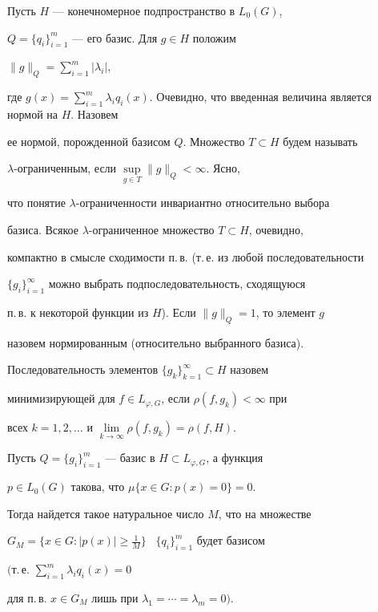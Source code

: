  


Пусть $H$ --- конечномерное подпространство в $L_0(G)$, 


$Q=\{q_i\}^m_{i=1}$ --- его базис. Для $g\in H$ положим 


$\|g\|_Q=\sum\limits^m_{i=1}|\lambda_i|$,


где $g(x)=\sum\limits^m_{i=1}\lambda_i 


q_i(x)$. Очевидно, что введенная величина является нормой на $H$. Назовем 


ее нормой, порожденной базисом $Q$. Множество $T\subset H$ будем называть 


$\lambda$-ограниченным, если $\sup\limits_{g\in T}\|g\|_Q<\infty$. Ясно, 


что понятие $\lambda$-ограниченности инвариантно относительно выбора 


базиса. Всякое $\lambda$-ограниченное множество $T\subset H$, очевидно, 


компактно в смысле сходимости п.\,в. (т.\,е. из любой последовательности 


$\{g_i\}^\infty_{i=1}$ можно выбрать подпоследовательность, сходящуюся 


п.\,в. к некоторой функции из $H$). Если $\|g\|_Q=1$, то элемент $g$ 


назовем нормированным (относительно выбранного базиса). 


 


Последовательность элементов $\{g_k\}^\infty_{k=1}\subset H$ назовем 


минимизирующей для $f\in L_{\varphi,G}$, если $\rho(f,g_k)<\infty$ при 


всех $k=1,2,\dotsc$ и $\lim\limits_{k\to\infty}\rho(f,g_k)=\rho(f,H)$. 


 


 


\begin{lem} 


Пусть $Q=\{g_i\}^m_{i=1}$ --- базис в $H\subset L_{\varphi,G}$, а функция 


$p\in L_0(G)$ такова, что $\mu\{x\in G:p(x)=0\}=0$. 


 


Тогда найдется такое натуральное число $M$, что на множестве 


$G_M=\{x\in G:|p(x)|\ge\frac{1}{M}\}$ \ $\{q_i\}^m_{i=1}$ будет базисом 


$\Big($т.\,е. $\sum\limits^m_{i=1}\lambda_i q_i(x)=0$ 


для п.\,в. $x\in G_M$ лишь при $\lambda_1=\dotsb=\lambda_m=0\Big)$. 


\end{lem} 


